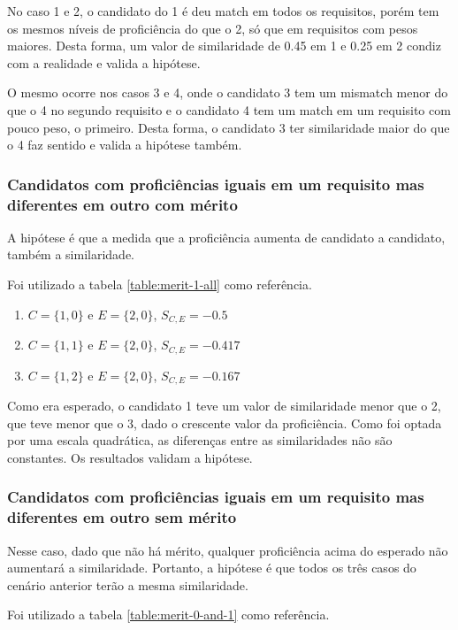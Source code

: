 \documentclass[preprint,12pt]{elsarticle}
\begin{document}
No caso 1 e 2, o candidato do 1 é deu match em todos os requisitos, porém tem os mesmos níveis de proficiência do que o 2, só que em requisitos com pesos maiores. Desta forma, um valor de similaridade de 0.45 em 1 e 0.25 em 2 condiz com a realidade e valida a hipótese.

O mesmo ocorre nos casos 3 e 4, onde o candidato 3 tem um mismatch menor do que o 4 no segundo requisito e o candidato 4 tem um match em um requisito com pouco peso, o primeiro. Desta forma, o candidato 3 ter similaridade maior do que o 4 faz sentido e valida a hipótese também.


\subsubsection{Candidatos com proficiências iguais em um requisito mas diferentes em outro com mérito}

A hipótese é que a medida que a proficiência aumenta de candidato a candidato, também a similaridade.

Foi utilizado a tabela \ref{table:merit-1-all} como referência.

\begin{enumerate}
    \item $C = \{1,0\}$ e $E = \{2,0\}$, $S_{C,E} = -0.5$
    \item $C = \{1,1\}$ e $E = \{2,0\}$, $S_{C,E} = -0.417$
    \item $C = \{1,2\}$ e $E = \{2,0\}$, $S_{C,E} = -0.167$
\end{enumerate}

Como era esperado, o candidato 1 teve um valor de similaridade menor que o 2, que teve menor que o 3, dado o crescente valor da proficiência. Como foi optada por uma escala quadrática, as diferenças entre as similaridades não são constantes. Os resultados validam a hipótese.

\subsubsection{Candidatos com proficiências iguais em um requisito mas diferentes em outro sem mérito}

Nesse caso, dado que não há mérito, qualquer proficiência acima do esperado não aumentará a similaridade. Portanto, a hipótese é que todos os três casos do cenário anterior terão a mesma similaridade.

Foi utilizado a tabela \ref{table:merit-0-and-1} como referência.
\end{document}
